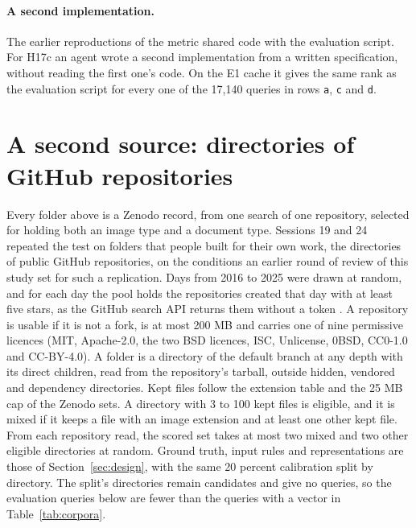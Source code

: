 \documentclass[11pt]{article}
\newcommand{\rep}[1]{\texttt{#1}}
\begin{document}
\paragraph{A second implementation.} The earlier reproductions of the metric shared code with the evaluation script. For H17c an agent wrote a second implementation from a written specification, without reading the first one's code. On the E1 cache it gives the same rank as the evaluation script for every one of the 17,140 queries in rows \rep{a}, \rep{c} and \rep{d}.

\section{A second source: directories of GitHub repositories}
\label{sec:github}

Every folder above is a Zenodo record, from one search of one repository, selected for holding both an image type and a document type. Sessions 19 and 24 repeated the test on folders that people built for their own work, the directories of public GitHub repositories, on the conditions an earlier round of review of this study set for such a replication. Days from 2016 to 2025 were drawn at random, and for each day the pool holds the repositories created that day with at least five stars, as the GitHub search API returns them without a token \citep{github2026search}. A repository is usable if it is not a fork, is at most 200 MB and carries one of nine permissive licences (MIT, Apache-2.0, the two BSD licences, ISC, Unlicense, 0BSD, CC0-1.0 and CC-BY-4.0). A folder is a directory of the default branch at any depth with its direct children, read from the repository's tarball, outside hidden, vendored and dependency directories. Kept files follow the extension table and the 25 MB cap of the Zenodo sets. A directory with 3 to 100 kept files is eligible, and it is mixed if it keeps a file with an image extension and at least one other kept file. From each repository read, the scored set takes at most two mixed and two other eligible directories at random. Ground truth, input rules and representations are those of Section~\ref{sec:design}, with the same 20 percent calibration split by directory. The split's directories remain candidates and give no queries, so the evaluation queries below are fewer than the queries with a vector in Table~\ref{tab:corpora}.
\end{document}
